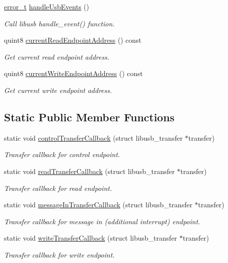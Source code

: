 \begin{DoxyCompactItemize}
\hyperlink{classmdt_abstract_port_ad4121bb930c95887e77f8bafa065a85e}{error\_\-t} \hyperlink{classmdt_usb_port_abb66e85fc1366112eeb0a6e86f6e7e32}{handleUsbEvents} ()
\begin{DoxyCompactList}\small\item\em Call libusb handle\_\-event() function. \end{DoxyCompactList}\item 
quint8 \hyperlink{classmdt_usb_port_a860e89069ba433e6174c032a28d0eae2}{currentReadEndpointAddress} () const 
\begin{DoxyCompactList}\small\item\em Get current read endpoint address. \end{DoxyCompactList}\item 
quint8 \hyperlink{classmdt_usb_port_ae2319ee6ff5a2f4399410175fbac6a44}{currentWriteEndpointAddress} () const 
\begin{DoxyCompactList}\small\item\em Get current write endpoint address. \end{DoxyCompactList}\end{DoxyCompactItemize}
\subsection*{Static Public Member Functions}
\begin{DoxyCompactItemize}
\item 
static void \hyperlink{classmdt_usb_port_a84ddd2d0bf77b4db60358846c7da4853}{controlTransferCallback} (struct libusb\_\-transfer $\ast$transfer)
\begin{DoxyCompactList}\small\item\em Transfer callback for control endpoint. \end{DoxyCompactList}\item 
static void \hyperlink{classmdt_usb_port_ab4f1f0456c84f954604b192f6085c3f2}{readTransferCallback} (struct libusb\_\-transfer $\ast$transfer)
\begin{DoxyCompactList}\small\item\em Transfer callback for read endpoint. \end{DoxyCompactList}\item 
static void \hyperlink{classmdt_usb_port_ae8932368e2777356695ab69f6ed08f41}{messageInTransferCallback} (struct libusb\_\-transfer $\ast$transfer)
\begin{DoxyCompactList}\small\item\em Transfer callback for message in (additional interrupt) endpoint. \end{DoxyCompactList}\item 
static void \hyperlink{classmdt_usb_port_af910071a5a5c401cd20cee3519120cc2}{writeTransferCallback} (struct libusb\_\-transfer $\ast$transfer)
\begin{DoxyCompactList}\small\item\em Transfer callback for write endpoint. \end{DoxyCompactList}\end{DoxyCompactItemize}


